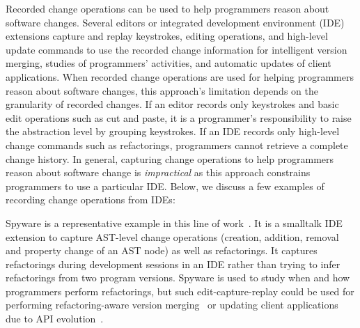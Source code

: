 Recorded change operations can be used to help programmers reason about software changes. Several editors or integrated development environment (IDE) extensions capture and replay keystrokes, editing operations, and high-level update commands to use the recorded change information for intelligent version merging, studies of programmers' activities, and automatic updates of client applications. When recorded change operations are used for helping programmers reason about software changes, this approach's limitation depends on the granularity of recorded changes. If an editor records only keystrokes and basic edit operations such as cut and paste, it is a programmer's responsibility to raise the abstraction level by grouping keystrokes. If an IDE records only high-level change commands such as refactorings, programmers cannot retrieve a complete change history. In general, capturing change operations to help programmers reason about software change is {\it impractical} as this approach constrains programmers to use a particular IDE.  Below, we discuss a few examples of recording change operations from IDEs:  

Spyware is a representative example in this line of work~\cite{Robbes2008:spyware}. It is a smalltalk IDE extension to capture AST-level change operations (creation, addition, removal and property change of an AST node) as well as refactorings. It captures refactorings during development sessions in an IDE rather than trying to infer refactorings from two program versions. Spyware is used to study when and how programmers perform refactorings, but such edit-capture-replay could be used for performing refactoring-aware version merging~\cite{Dig2007} or updating client applications due to API evolution~\cite{Henkel2005}. %


